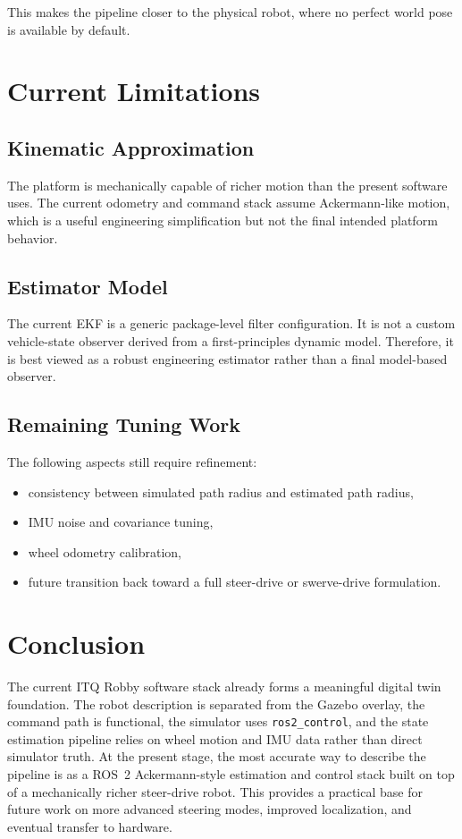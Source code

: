 \documentclass[12pt,a4paper]{report}
\begin{document}
This makes the pipeline closer to the physical robot, where no perfect world pose is available by default.

\chapter{Current Limitations}

\section{Kinematic Approximation}
The platform is mechanically capable of richer motion than the present software uses. The current odometry and command stack assume Ackermann-like motion, which is a useful engineering simplification but not the final intended platform behavior.

\section{Estimator Model}
The current EKF is a generic package-level filter configuration. It is not a custom vehicle-state observer derived from a first-principles dynamic model. Therefore, it is best viewed as a robust engineering estimator rather than a final model-based observer.

\section{Remaining Tuning Work}
The following aspects still require refinement:
\begin{itemize}[leftmargin=*]
  \item consistency between simulated path radius and estimated path radius,
  \item IMU noise and covariance tuning,
  \item wheel odometry calibration,
  \item future transition back toward a full steer-drive or swerve-drive formulation.
\end{itemize}

\chapter{Conclusion}
The current ITQ Robby software stack already forms a meaningful digital twin foundation. The robot description is separated from the Gazebo overlay, the command path is functional, the simulator uses \texttt{ros2\_control}, and the state estimation pipeline relies on wheel motion and IMU data rather than direct simulator truth. At the present stage, the most accurate way to describe the pipeline is as a ROS~2 Ackermann-style estimation and control stack built on top of a mechanically richer steer-drive robot. This provides a practical base for future work on more advanced steering modes, improved localization, and eventual transfer to hardware.
\end{document}
